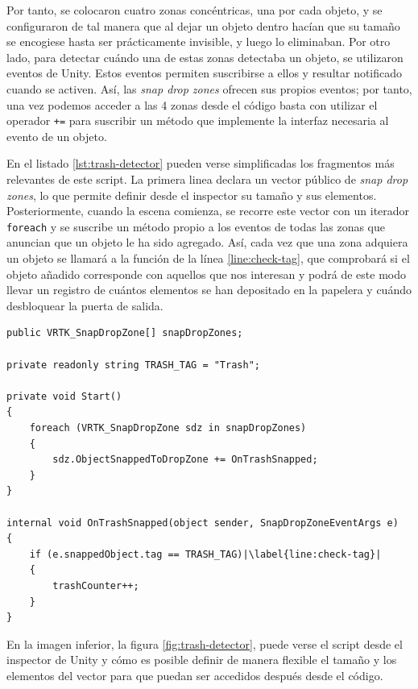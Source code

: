 Por tanto, se colocaron cuatro zonas concéntricas, una por cada objeto, y se configuraron de tal manera que al dejar un objeto dentro hacían que su tamaño se encogiese hasta ser prácticamente invisible, y luego lo eliminaban. Por otro lado, para detectar cuándo una de estas zonas detectaba un objeto, se utilizaron eventos de Unity. Estos eventos permiten suscribirse a ellos y resultar notificado cuando se activen. Así, las \textit{snap drop zones} ofrecen sus propios eventos; por tanto, una vez podemos acceder a las 4 zonas desde el código basta con utilizar el operador \texttt{+=} para suscribir un método que implemente la interfaz necesaria al evento de un objeto.

En el listado \ref{lst:trash-detector} pueden verse simplificadas los fragmentos más relevantes de este script. La primera linea declara un vector público de \textit{snap drop zones}, lo que permite definir desde el inspector su tamaño y sus elementos. Posteriormente, cuando la escena comienza, se recorre este vector con un iterador \texttt{foreach} y se suscribe un método propio a los eventos de todas las zonas que anuncian que un objeto le ha sido agregado. Así, cada vez que una zona adquiera un objeto se llamará a la función de la línea \ref{line:check-tag}, que comprobará si el objeto añadido corresponde con aquellos que nos interesan y podrá de este modo llevar un registro de cuántos elementos se han depositado en la papelera y cuándo desbloquear la puerta de salida. 

\begin{lstlisting}[caption=Fragmento del script para detectar piezas de basura, label=lst:trash-detector, escapechar=|]
public VRTK_SnapDropZone[] snapDropZones;

private readonly string TRASH_TAG = "Trash";

private void Start()
{
    foreach (VRTK_SnapDropZone sdz in snapDropZones)
    {
        sdz.ObjectSnappedToDropZone += OnTrashSnapped;
    }
}

internal void OnTrashSnapped(object sender, SnapDropZoneEventArgs e)
{
    if (e.snappedObject.tag == TRASH_TAG)|\label{line:check-tag}|
    {
        trashCounter++;
    }
}
\end{lstlisting}

En la imagen inferior, la figura \ref{fig:trash-detector}, puede verse el script desde el inspector de Unity y cómo es posible definir de manera flexible el tamaño y los elementos del vector para que puedan ser accedidos después desde el código. 

